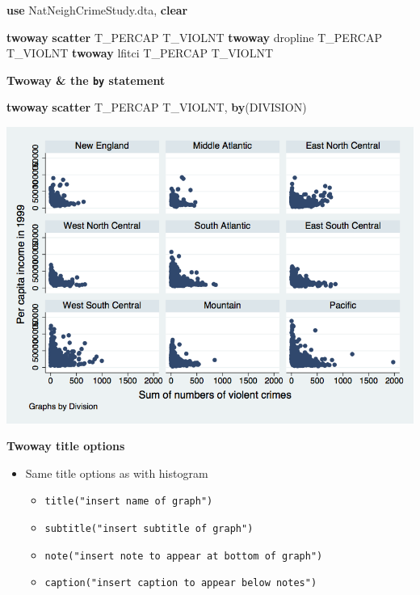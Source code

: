 \documentclass[
]{book}
\newenvironment{Shaded}{\begin{snugshade}}{\end{snugshade}}
\newcommand{\BaseNTok}[1]{\textcolor[rgb]{0.00,0.00,0.81}{#1}}
\newcommand{\KeywordTok}[1]{\textcolor[rgb]{0.13,0.29,0.53}{\textbf{#1}}}
\newcommand{\NormalTok}[1]{#1}
\providecommand{\tightlist}{%
  \setlength{\itemsep}{0pt}\setlength{\parskip}{0pt}}
\begin{document}
\begin{Shaded}
\begin{Highlighting}[]
\KeywordTok{use}\NormalTok{ NatNeighCrimeStudy.dta, }\KeywordTok{clear}

\KeywordTok{twoway} \KeywordTok{scatter}\NormalTok{ T\_PERCAP T\_VIOLNT}
\KeywordTok{twoway} \BaseNTok{dropline}\NormalTok{ T\_PERCAP T\_VIOLNT}
\KeywordTok{twoway}\NormalTok{ lfitci T\_PERCAP T\_VIOLNT}
\end{Highlighting}
\end{Shaded}

\textbf{Twoway \& the \texttt{by} statement}

\begin{Shaded}
\begin{Highlighting}[]
\KeywordTok{twoway} \KeywordTok{scatter}\NormalTok{ T\_PERCAP T\_VIOLNT, }\KeywordTok{by}\NormalTok{(DIVISION)}
\end{Highlighting}
\end{Shaded}

\includegraphics{Stata/StataGraphics/images/twowayby.png}

\textbf{Twoway title options}

\begin{itemize}
\tightlist
\item
  Same title options as with histogram

  \begin{itemize}
  \tightlist
  \item
    \texttt{title("insert\ name\ of\ graph")}
  \item
    \texttt{subtitle("insert\ subtitle\ of\ graph")}
  \item
    \texttt{note("insert\ note\ to\ appear\ at\ bottom\ of\ graph")}
  \item
    \texttt{caption("insert\ caption\ to\ appear\ below\ notes")}
  \end{itemize}
\end{itemize}
\end{document}
